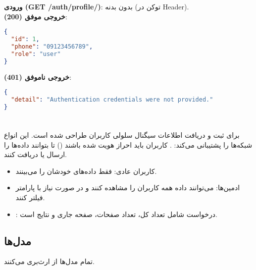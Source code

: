 \documentclass{report}
\begin{document}
\textbf{ورودی (GET /auth/profile/)}: بدون بدنه (توکن در Header). \\

\textbf{خروجی موفق (200)}:
\begin{lstlisting}[language=json]
{
  "id": 1,
  "phone": "09123456789",
  "role": "user"
}
\end{lstlisting}

\textbf{خروجی ناموفق (401)}:
\begin{lstlisting}[language=json]
{
  "detail": "Authentication credentials were not provided."
}
\end{lstlisting}

\section{}

 برای ثبت و دریافت اطلاعات سیگنال سلولی کاربران طراحی شده است. این  انواع شبکه‌ها را پشتیبانی می‌کند: . کاربران باید احراز هویت شده باشند () تا بتوانند داده‌ها را ارسال یا دریافت کنند.
\begin{itemize}
    \item کاربران عادی: فقط داده‌های خودشان را می‌بینند.
    \item ادمین‌ها: می‌توانند داده همه کاربران را مشاهده کنند و در صورت نیاز با پارامتر  فیلتر کنند.
    \item {}: درخواست  شامل تعداد کل، تعداد صفحات، صفحه جاری و نتایج است.
\end{itemize}

\subsection{مدل‌ها}
تمام مدل‌ها از  ارث‌بری می‌کنند.
\end{document}
